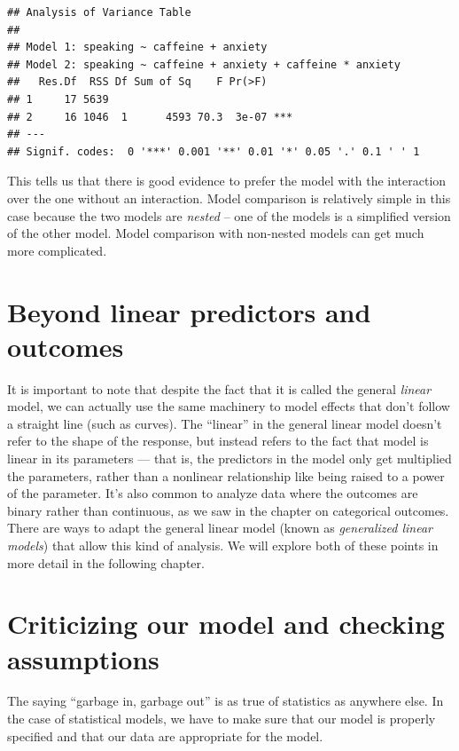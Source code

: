 \documentclass[12pt,]{book}
\theoremstyle{definition}
\theoremstyle{definition}
\theoremstyle{definition}
\theoremstyle{remark}
\begin{document}
\begin{verbatim}
## Analysis of Variance Table
## 
## Model 1: speaking ~ caffeine + anxiety
## Model 2: speaking ~ caffeine + anxiety + caffeine * anxiety
##   Res.Df  RSS Df Sum of Sq    F Pr(>F)    
## 1     17 5639                             
## 2     16 1046  1      4593 70.3  3e-07 ***
## ---
## Signif. codes:  0 '***' 0.001 '**' 0.01 '*' 0.05 '.' 0.1 ' ' 1
\end{verbatim}

This tells us that there is good evidence to prefer the model with the interaction over the one without an interaction. Model comparison is relatively simple in this case because the two models are \emph{nested} -- one of the models is a simplified version of the other model. Model comparison with non-nested models can get much more complicated.

\hypertarget{beyond-linear-predictors-and-outcomes}{%
\section{Beyond linear predictors and outcomes}\label{beyond-linear-predictors-and-outcomes}}

It is important to note that despite the fact that it is called the general \emph{linear} model, we can actually use the same machinery to model effects that don't follow a straight line (such as curves). The ``linear'' in the general linear model doesn't refer to the shape of the response, but instead refers to the fact that model is linear in its parameters --- that is, the predictors in the model only get multiplied the parameters, rather than a nonlinear relationship like being raised to a power of the parameter. It's also common to analyze data where the outcomes are binary rather than continuous, as we saw in the chapter on categorical outcomes. There are ways to adapt the general linear model (known as \emph{generalized linear models}) that allow this kind of analysis. We will explore both of these points in more detail in the following chapter.

\hypertarget{model-criticism}{%
\section{Criticizing our model and checking assumptions}\label{model-criticism}}

The saying ``garbage in, garbage out'' is as true of statistics as anywhere else. In the case of statistical models, we have to make sure that our model is properly specified and that our data are appropriate for the model.
\end{document}
